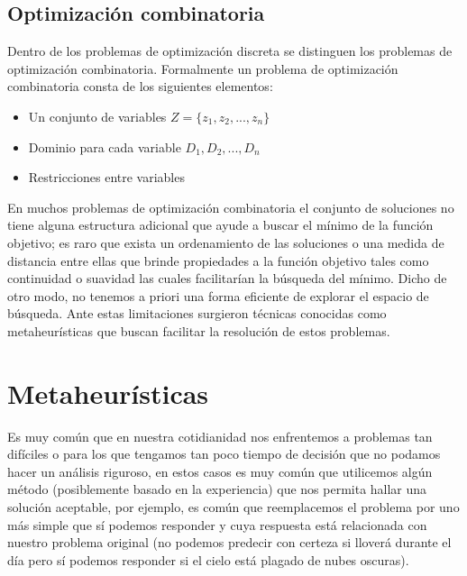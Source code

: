 \subsection*{Optimización combinatoria}
Dentro de los problemas de optimización discreta se distinguen los problemas de optimización combinatoria. Formalmente un problema de optimización combinatoria consta de los siguientes elementos\cite{Blum2003}:
\begin{itemize}
    \item Un conjunto de variables $Z=\{z_1,z_2,...,z_n\}$
    \item Dominio para cada variable $D_1,D_2,...,D_n$
    \item Restricciones entre variables
\end{itemize}

En muchos problemas de optimización combinatoria el conjunto de soluciones no tiene alguna estructura adicional que ayude a buscar el mínimo de la función objetivo; es raro que exista un ordenamiento de las soluciones o una medida de distancia entre ellas que brinde propiedades a la función objetivo tales como continuidad o suavidad las cuales facilitarían la búsqueda del mínimo. Dicho de otro modo, no tenemos a priori una forma eficiente de explorar el espacio de búsqueda. Ante estas limitaciones surgieron técnicas conocidas como metaheurísticas que buscan facilitar la resolución de estos problemas.

\section{Metaheurísticas}
Es muy común que en nuestra cotidianidad nos enfrentemos a problemas tan difíciles o para los que tengamos tan poco tiempo de decisión que no podamos hacer un análisis riguroso, en estos casos es muy común que utilicemos algún método (posiblemente basado en la experiencia) que nos permita hallar una solución aceptable, por ejemplo, es común que reemplacemos el problema por uno más simple que sí podemos responder y cuya respuesta está relacionada con nuestro problema original (no podemos predecir con certeza si lloverá durante el día pero sí podemos responder si el cielo está plagado de nubes oscuras).

